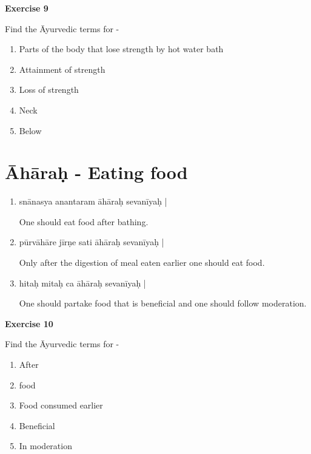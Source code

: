 \begin{center}
\textbf{\large Exercise 9}
\end{center}

Find the Āyurvedic terms for -
\begin{enumerate}
\renewcommand{\theenumi}{\alph{enumi}}
\renewcommand{\labelenumi}{\theenumi.}
\item Parts of the body that lose strength by hot water bath 
\item Attainment of strength 
\item Loss of strength
\item Neck 
\item Below
\end{enumerate}

\chapter{Āhāraḥ - Eating food}

\begin{enumerate}
\item {}

snānasya anantaram āhāraḥ sevanīyaḥ |

One should eat food after bathing. 

\item {}

pūrvāhāre jīrṇe sati  āhāraḥ sevanīyaḥ |

Only after the digestion of meal eaten earlier one should eat food. 

\item {}

hitaḥ mitaḥ ca āhāraḥ sevanīyaḥ |

One should partake food that is beneficial and one should follow moderation.
\end{enumerate}

\begin{center}
\textbf{\large Exercise 10}
\end{center}

Find the Āyurvedic terms for - 
\begin{enumerate}
\renewcommand{\theenumi}{\alph{enumi}}
\renewcommand{\labelenumi}{\theenumi.}
\item After
\item food 
\item Food consumed earlier
\item Beneficial
\item In moderation
\end{enumerate}

